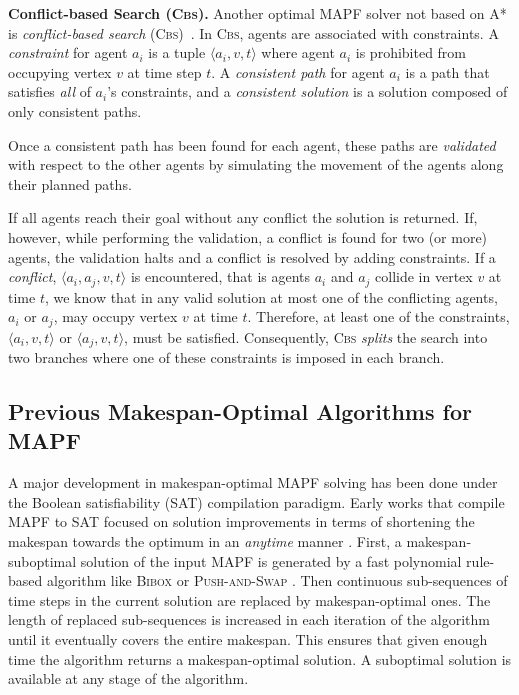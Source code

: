 \documentclass[jair,oneside,11pt]{article}
\begin{document}
{\bf Conflict-based Search (\textsc{Cbs}).} Another optimal MAPF solver not based on A* is {\em conflict-based
search} (\textsc{Cbs})~\cite{CBSJUR}. In \textsc{Cbs}, agents are associated with constraints. A {\em constraint} for agent
$a_i$ is a tuple $\langle a_i,v,t \rangle$ where agent $a_i$ is prohibited from
occupying vertex $v$ at time step $t$. A {\em consistent path} for agent $a_i$ is a path that satisfies {\em all} of $a_i$'s constraints, and a {\em consistent solution} is a solution composed of only consistent paths. 

Once a consistent path has been found for each agent, these paths are {\em validated} with respect to the other agents by simulating the movement of the agents along their planned paths.

If all agents reach their goal without any conflict the solution is returned. If, however, while performing the
validation, a conflict is found for two (or more) agents, the validation halts and a conflict is resolved by adding constraints.
If a \emph{conflict}, $\langle a_i,a_j,v,t \rangle$ is encountered, that is agents $a_i$ and $a_j$ collide in vertex $v$ at time $t$, we know that in any valid solution at most one of the conflicting agents, $a_i$ or $a_j$, may occupy vertex $v$ at time $t$.
Therefore, at least one of the constraints, $\langle a_i,v,t \rangle$ or $\langle a_j,v,t \rangle$, must be satisfied. Consequently, \textsc{Cbs} {\em splits} the search into two branches where one of these constraints is imposed in each branch.

\subsection{Previous Makespan-Optimal Algorithms for MAPF}

A major development in makespan-optimal MAPF solving has been done under the Boolean satisfiability (SAT) \cite{Biere:2009:HSV:1550723} compilation paradigm. Early works that
compile MAPF to SAT focused on solution improvements in terms of shortening the makespan towards the optimum in an {\em anytime} manner \cite{DBLP:conf/pricai/Surynek12}. First, a makespan-suboptimal solution of the input MAPF is generated by a fast polynomial rule-based algorithm like \textsc{Bibox} \cite{DBLP:journals/ci/Surynek14} or \textsc{Push-and-Swap} \cite{DBLP:conf/aaai/LunaB11,DBLP:conf/atal/WildeMW13}. Then continuous sub-sequences of time steps in the current solution are replaced by makespan-optimal ones. The length of replaced sub-sequences is increased in each iteration of the algorithm until it eventually covers the entire makespan. This ensures that given enough time the algorithm returns a makespan-optimal solution. A suboptimal solution is available at any stage of the algorithm.
\end{document}

